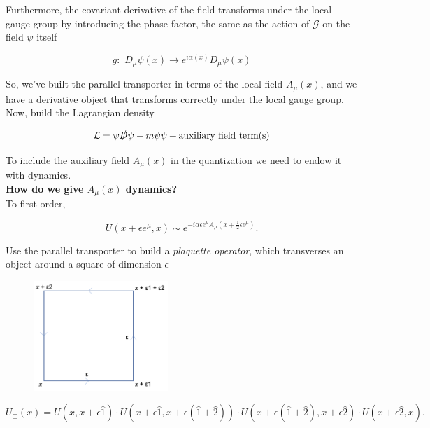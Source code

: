 \noindent Furthermore, the covariant derivative of the field transforms under the local gauge group by introducing the phase factor, the same as the action of $\mathcal{G}$ on the field $\psi$ itself

\begin{equation}
g: \,\, D_\mu \psi (x) \rightarrow e^{i \alpha (x)} D_\mu \psi (x)
\end{equation}

\noindent So, we've built the parallel transporter in terms of the local field $A_\mu (x)$, and we have a derivative object that transforms correctly under the local gauge group. Now, build the Lagrangian density

\begin{equation}
\mathcal{L} = \bar{\psi} \slashed{D} \psi - m \bar{\psi} \psi + \text{auxiliary field term(s)}
\end{equation}

\noindent To include the auxiliary field $A_\mu (x)$ in the quantization we need to endow it with dynamics. \\

\noindent \textbf{How do we give $A_\mu (x)$ dynamics?} \\

\noindent To first order,

\begin{equation}
U(x+\epsilon e^\mu , x) \sim e^{-i\alpha \epsilon e^\mu A_\mu (x + \frac{1}{2} \epsilon e^\mu)}.
\end{equation}

\noindent Use the parallel transporter to build a \textit{plaquette operator}, which transverses an object around a square of dimension $\epsilon$

\begin{figure}[H]
	\centering
	\includegraphics[width=2in]{images/plaquette.png}
\end{figure}

\begin{equation}
U_\Box(x)  = U(x, x + \epsilon \hat{1}) \cdot U (x + \epsilon \hat{1}, x + \epsilon (\hat{1} + \hat{2})) \cdot U(x + \epsilon (\hat{1} + \hat{2}), x + \epsilon \hat{2}) \cdot U(x + \epsilon \hat{2}, x).
\end{equation}


